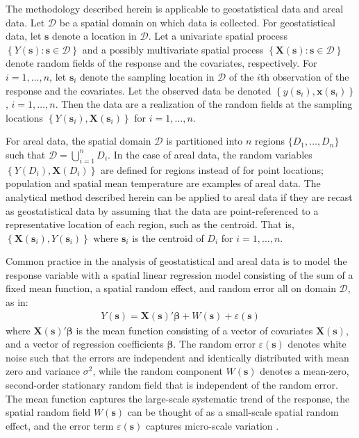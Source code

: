 \documentclass[authoryear, review, 11pt]{elsarticle}
\begin{document}
	The methodology described herein is applicable to geostatistical data and areal data. Let $\mathcal{D}$ be a spatial domain on which data is collected. For geostatistical data, let $\bm{s}$ denote a location in $\mathcal{D}$. Let a univariate spatial process $\left\{Y(\bm{s}) : \bm{s} \in \mathcal{D}\right\}$ and a possibly multivariate spatial process $\left\{\bm{X}(\bm{s}) : \bm{s} \in \mathcal{D}\right\}$ denote random fields of the response and the covariates, respectively. For $i = 1, \dots, n$, let $\bm{s}_i$ denote the sampling location in $\mathcal{D}$ of the $i$th observation of the response and the covariates. Let the observed data be denoted $\left\{y(\bm{s}_i), \bm{x}(\bm{s}_i)\right\}$, $i=1, \dots, n$. Then the data are a realization of the random fields at the sampling locations $\left\{Y(\bm{s}_i), \bm{X}(\bm{s}_i)\right\}$ for $i=1, \dots, n$.
	
	For areal data, the spatial domain $\mathcal{D}$ is partitioned into $n$ regions $\{D_1, \dots, D_n\}$ such that $\mathcal{D} = \bigcup \limits_{i=1}^n D_i$. In the case of areal data, the random variables $\left\{Y(D_i), \bm{X}(D_i)\right\}$ are defined for regions instead of for point locations; population and spatial mean temperature are examples of areal data. The analytical method described herein can be applied to areal data if they are recast as geostatistical data by assuming that the data are point-referenced to a representative location of each region, such as the centroid. That is, $\left\{\bm{X}(\bm{s}_i), Y(\bm{s}_i)\right\} $ where $\bm{s}_i$ is the centroid of $D_i$ for $i=1, \dots, n$.
	
	 Common practice in the analysis of geostatistical and areal data is to model the response variable with a spatial linear regression model consisting of the sum of a fixed mean function, a spatial random effect, and random error all on domain $\mathcal{D}$, as in: 
\begin{align}\label{eq:spatial-regression}
    Y(\bm{s}) = \bm{X}(\bm{s})'\bm{\beta} + W(\bm{s}) + \varepsilon(\bm{s})
\end{align}
where $\bm{X}(\bm{s})'\bm{\beta}$ is the mean function consisting of a vector of covariates $\bm{X}(\bm{s})$, and a vector of regression coefficients $\bm{\beta}$. The random error $\varepsilon(\bm{s})$ denotes white noise such that the errors are independent and identically distributed with mean zero and variance $\sigma^2$, while the random component $W(\bm{s})$ denotes a mean-zero, second-order stationary random field that is independent of the random error. The mean function captures the large-scale systematic trend of the response, the spatial random field $W(\bm{s})$ can be thought of as a small-scale spatial random effect, and the error term $\varepsilon(\bm{s})$ captures micro-scale variation \citep{Cressie:1993}.
\end{document}
